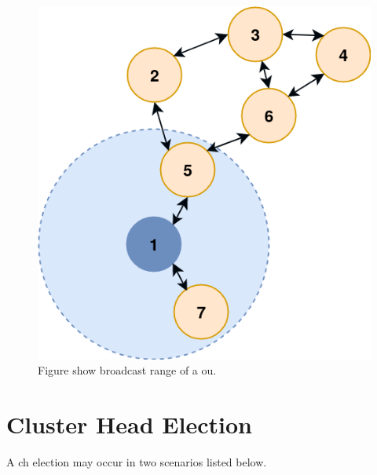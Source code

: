 \documentclass[USenglish]{uit-thesis}
\begin{document}
\begin{figure}
\centering
\includegraphics[scale=0.4]{broadcast_range.png}
\caption{Figure show broadcast range of a \gls{ou}.}
\label{fig:broadcast_range}
\end{figure}



\newpage

\section{Cluster Head Election} \label{des:ch_election}
A \gls{ch} election may occur in two scenarios listed below.

\end{document}
